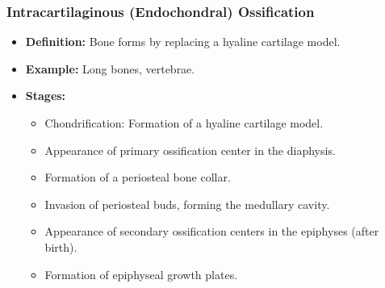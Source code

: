 \documentclass[11pt]{article}
\begin{document}
\subsubsection*{Intracartilaginous (Endochondral) Ossification}
\begin{itemize}
    \item \textbf{Definition:} Bone forms by replacing a hyaline cartilage model.
    \item \textbf{Example:} Long bones, vertebrae.
    \item \textbf{Stages:}
    \begin{itemize}
        \item Chondrification: Formation of a hyaline cartilage model.
        \item Appearance of primary ossification center in the diaphysis.
        \item Formation of a periosteal bone collar.
        \item Invasion of periosteal buds, forming the medullary cavity.
        \item Appearance of secondary ossification centers in the epiphyses (after birth).
        \item Formation of epiphyseal growth plates.
    \end{itemize}
\end{itemize}
\end{document}
